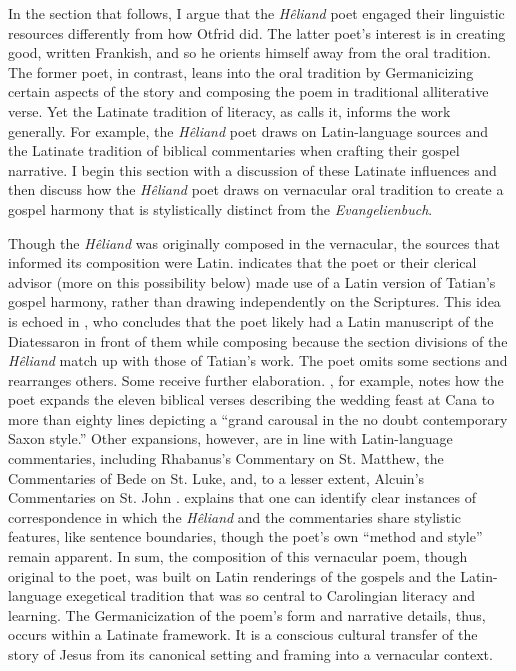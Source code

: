 In the section that follows, I argue that the \textit{Hêliand} poet engaged their linguistic resources differently from how Otfrid did. The latter poet’s interest is in creating good, written Frankish, and so he orients himself away from the oral tradition. The former poet, in contrast, leans into the oral tradition by Germanicizing certain aspects of the story and composing the poem in traditional alliterative verse. Yet the Latinate tradition of literacy, as \citet{Somers2021b} calls it, informs the work generally. For example, the \textit{Hêliand} poet draws on Latin-language sources and the Latinate tradition of biblical commentaries when crafting their gospel narrative. I begin this section with a discussion of these Latinate influences and then discuss how the \textit{Hêliand} poet draws on vernacular oral tradition to create a gospel harmony that is stylistically distinct from the \textit{Evangelienbuch}.

Though the \textit{Hêliand} was originally composed in the vernacular, the sources that informed its composition were Latin. \citet[178--179]{Bostock1976} indicates that the poet or their clerical advisor (more on this possibility below) made use of a Latin version of Tatian’s gospel harmony, rather than drawing independently on the Scriptures. This idea is echoed in \citet[168--169]{Haferland2010}, who concludes that the poet likely had a Latin manuscript of the Diatessaron in front of them while composing because the section divisions of the \textit{Hêliand} match up with those of Tatian’s work. The poet omits some sections and rearranges others. Some receive further elaboration. \citet[174]{Bostock1976}, for example, notes how the poet expands the eleven biblical verses describing the wedding feast at Cana to more than eighty lines depicting a “grand carousal in the no doubt contemporary Saxon style.” Other expansions, however, are in line with Latin-language commentaries, including Rhabanus’s Commentary on St. Matthew, the Commentaries of Bede on St. Luke, and, to a lesser extent, Alcuin’s Commentaries on St. John \citep[178--179]{Bostock1976}. \citet[169]{Haferland2010} explains that one can identify clear instances of correspondence in which the \textit{Hêliand} and the commentaries share stylistic features, like sentence boundaries, though the poet’s own “method and style” remain apparent. In sum, the composition of this vernacular poem, though original to the poet, was built on Latin renderings of the gospels and the Latin-language exegetical tradition that was so central to Carolingian literacy and learning. The Germanicization of the poem’s form and narrative details, thus, occurs within a Latinate framework. It is a conscious cultural transfer of the story of Jesus from its canonical setting and framing into a vernacular context.

